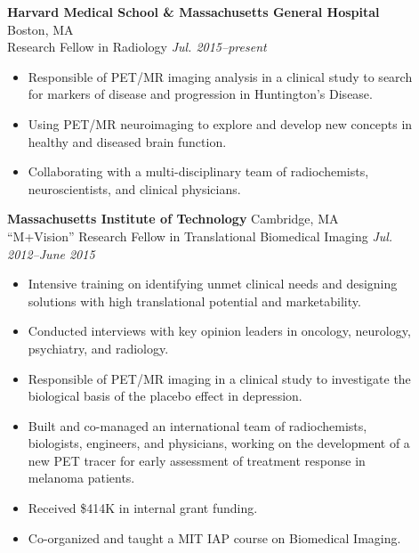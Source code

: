 \documentclass[letterpaper]{article}
\begin{document}
\begin{description}

\item[] \textbf{Harvard Medical School \& Massachusetts General Hospital } \hfill Boston, MA\\
Research Fellow in Radiology \hfill \textit{Jul. 2015--present} 
\vspace*{-0.2cm}
\begin{itemize}
 \item Responsible of PET/MR imaging analysis in a clinical study to search for markers of disease and progression in Huntington's Disease. %
 \item Using PET/MR neuroimaging to explore and develop new concepts in healthy and diseased brain function.
 \item Collaborating with a multi-disciplinary team of radiochemists, neuroscientists, and clinical physicians.
  
\end{itemize}

\item[] \textbf{Massachusetts Institute of Technology} \hfill Cambridge, MA \\
``M+Vision'' Research Fellow in Translational Biomedical Imaging \hfill \textit{Jul. 2012--June 2015} 
\vspace*{-0.2cm}
\begin{itemize} 
\item Intensive training on identifying unmet clinical needs and designing
    solutions with high translational potential and marketability.
 \item Conducted interviews with key opinion leaders in oncology, neurology, psychiatry, and radiology.
 \item Responsible of PET/MR imaging in a clinical study to investigate the biological basis of the placebo effect in depression.
\item Built and co-managed an international team of radiochemists, biologists, engineers, and physicians, working on the development of a new PET tracer for early assessment of treatment response in melanoma patients. 
\item Received \$414K in internal grant funding. 
\item Co-organized and taught a MIT IAP course on Biomedical Imaging.
\end{itemize}


\end{description}
\end{document}

